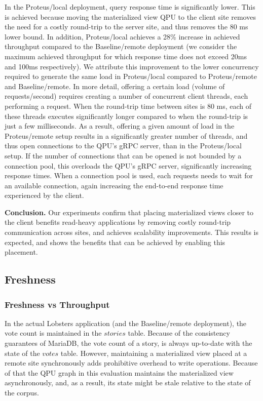 In the Proteus/local deployment, query response time is significantly lower.
This is achieved because moving the materialized view QPU to the client site removes the need for a costly round-trip to
the server site, and thus removes the 80 ms lower bound.
In addition, Proteus/local achieves a 28\% increase in achieved throughput compared to the Baseline/remote deployment
(we consider the maximum achieved throughput for which response time does not exceed 20ms and 100ms respectively).
We attribute this improvement to the lower concurrency required to generate the same load in Proteus/local
compared to Proteus/remote and Baseline/remote.
In more detail, offering a certain load (volume of requests/second) requires creating a number of concurrent client threads,
each performing a request.
When the round-trip time between sites is 80 ms, each of these threads executes significantly longer compared to
when the round-trip is just a few milliseconds.
As a result, offering a given amount of load in the Proteus/remote setup results in a significantly greater number
of threads, and thus open connections to the QPU's gRPC server, than in the Proteus/local setup.
If the number of connections that can be opened is not bounded by a connection pool, this overloads the QPU's gRPC server,
significantly increasing response times.
When a connection pool is used, each requests needs to wait for an available connection,
again increasing the end-to-end response time experienced by the client.

\medskip
\noindent
\textbf{Conclusion.} Our experiments confirm that placing materialized views closer to the client benefits read-heavy applications
by removing costly round-trip communication across sites, and achieves scalability improvements.
This results is expected, and shows the benefits that can be achieved by enabling this placement.


\subsection{Freshness}
\label{sec:eval_freshness}

\subsubsection{Freshness vs Throughput}
\label{sec:eval_freshness_throughput}

In the actual Lobsters application (and the Baseline/remote deployment),
the vote count is maintained in the $stories$ table.
Because of the consistency guarantees of MariaDB,
the vote count of a story, is always up-to-date with the state of the $votes$ table.
However, maintaining a materialized view placed at a remote site synchronously adds prohibitive overhead to write operations.
Because of that the QPU graph in this evaluation maintains the materialized view asynchronously, and, as a result,
its state might be stale relative to the state of the corpus.

